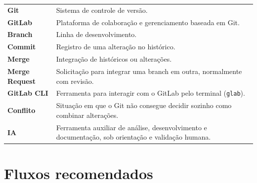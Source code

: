 \begin{center}
\renewcommand{\arraystretch}{1.45}
\begin{tabularx}{\linewidth}{@{}>{\bfseries\color{azulMB}}l X@{}}
\toprule
Git & Sistema de controle de versão. \\
GitLab & Plataforma de colaboração e gerenciamento baseada em Git. \\
Branch & Linha de desenvolvimento. \\
Commit & Registro de uma alteração no histórico. \\
Merge & Integração de históricos ou alterações. \\
Merge Request & Solicitação para integrar uma branch em outra, normalmente com revisão. \\
GitLab CLI & Ferramenta para interagir com o GitLab pelo terminal (\texttt{glab}). \\
Conflito & Situação em que o Git não consegue decidir sozinho como combinar alterações. \\
IA & Ferramenta auxiliar de análise, desenvolvimento e documentação, sob orientação e validação humana. \\
\bottomrule
\end{tabularx}
\end{center}

\section{Fluxos recomendados}

\begin{center}
\end{center}


